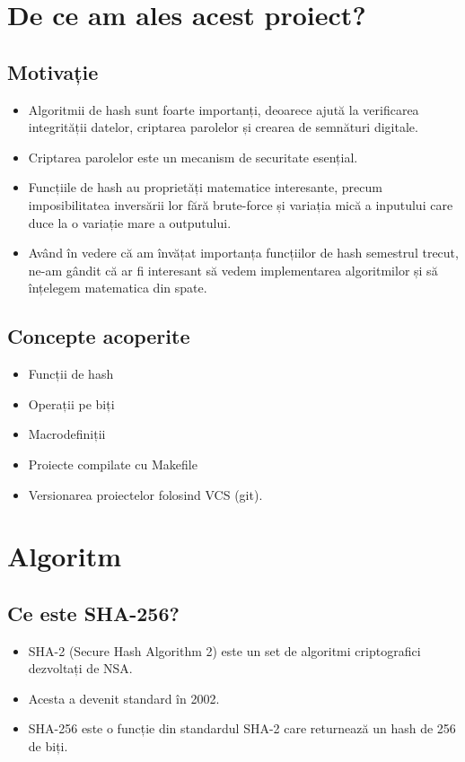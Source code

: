 \documentclass{article}
\begin{document}
\newpage
\section{De ce am ales acest proiect?}
\subsection{Motivație}
\begin{itemize}
      \item Algoritmii de hash sunt foarte importanți, deoarece ajută la
            verificarea integrității datelor, criptarea parolelor și crearea de
            semnături digitale.

      \item Criptarea parolelor este un mecanism de securitate esențial.

      \item Funcțiile de hash au proprietăți matematice interesante, precum
            imposibilitatea inversării lor fără brute-force și variația mică a
            inputului care duce la o variație mare a outputului.

      \item Având în vedere că am învățat importanța funcțiilor de hash semestrul
            trecut, ne-am gândit că ar fi interesant să vedem implementarea
            algoritmilor și să înțelegem matematica din spate.
\end{itemize}

\subsection{Concepte acoperite}
\begin{itemize}
      \item Funcții de hash
      \item Operații pe biți
      \item Macrodefiniții
      \item Proiecte compilate cu Makefile
      \item Versionarea proiectelor folosind VCS (git).
\end{itemize}

\newpage
\section{Algoritm}
\subsection{Ce este SHA-256?}
\begin{itemize}
      \item SHA-2 (Secure Hash Algorithm 2) este un set de algoritmi criptografici
            dezvoltați de NSA.

      \item Acesta a devenit standard în 2002.

      \item SHA-256 este o funcție din standardul SHA-2 care returnează un hash de
            256 de biți.
\end{itemize}
\end{document}
